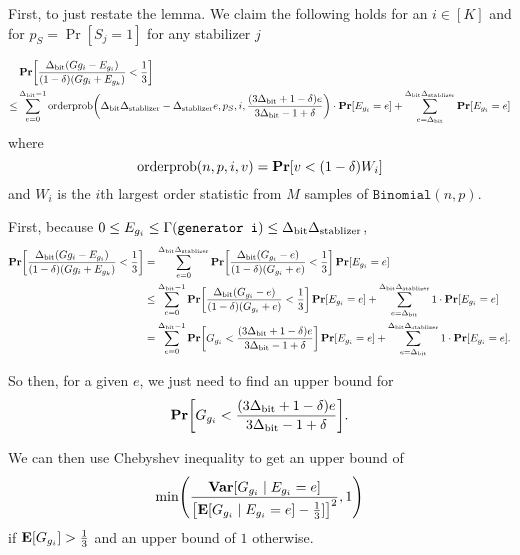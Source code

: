 \newcommand{\orderpinner}{\DegBit\DegStable - \DegStable e, p_S, i, \frac{(3\DegBit + 1 - \delta) e}{3\DegBit -1 + \delta}}
\newcommand{\desiredGPrimeUpperBound}{\frac{(3 \DegBit + 1 - \delta) e}{3 \DegBit - 1 + \delta}}
\newcommand{\generatorscoreRVGivenE}{G^e}

First, to just restate the lemma.
We claim the following holds for an $i \in [K]$ and for $p_S = \Pr[S_j = 1]$ for any stabilizer $j$
	
\begin{align*}
	&\Pr\mleft[\OptVarEq < \frac{1}{3}\mright] \\
	\leq &\sum_{e = 0}^{\DegBit - 1} 
			\OrderP\mleft(\orderpinner\mright) \cdot \Pr[\lyingGenerator_{g_i} = e] 
			+ \sum_{e = \DegBit}^{\DegBit\DegStable}\Pr[\lyingGenerator_{g_i} = e]
\end{align*}
where
$$
	\OrderP(n, p, i, v) = \Pr\mleft[v < (1 - \delta) W_i \mright]
$$
and $W_i$ is the $i$th largest order statistic from $M$ samples of $\texttt{Binomial}(n, p)$.


First, because $0 \leq E_{g_i} \leq \Gamma(\texttt{generator i}) \leq {\Delta_{\text{bit}}} {\Delta_{\text{stablizer}}}$, 
\begin{align*}
\Pr\mleft[\OptVarEq < \frac{1}{3}\mright] &= 
	\sum_{e = 0}^{\DegBit \DegStable} 
		\Pr\mleft[\frac{\DegBit(\genscoreRVCorrected_{g_i} - e)}{(1 - \delta)(\genscoreRVCorrected_{g_i} + e)} < \frac{1}{3} \mright] \Pr\mleft[\lyingGenerator_{g_i} = e\mright]\\
&\leq
	\sum_{e = 0}^{\DegBit - 1} 
		\Pr\mleft[\frac{\DegBit(\genscoreRVCorrected_{g_i} - e)}{(1 - \delta)(\genscoreRVCorrected_{g_i} + e)} < \frac{1}{3} \mright] \Pr\mleft[\lyingGenerator_{g_i} = e\mright]
	+ \sum_{e = \DegBit}^{\DegBit \DegStable} 1 \cdot \Pr\mleft[E_{g_i} = e\mright]\\
&=
	\sum_{e = 0}^{\DegBit - 1} 
		\Pr\mleft[\genscoreRVCorrected_{g_i} < \frac{(3 \DegBit + 1 - \delta) e}{3 \DegBit - 1 + \delta} \mright] \Pr\mleft[E_{g_i} = e\mright]
	+ \sum_{e = \DegBit}^{\DegBit \DegStable} 1 \cdot \Pr\mleft[\lyingGenerator_{g_i} = e\mright].\\
\end{align*}

So then, for a given $e$,
we just need to find an upper bound for
\begin{align*}
	\Pr\mleft[\genscoreRVCorrected_{g_i} < \desiredGPrimeUpperBound \mright].
\end{align*}

We can then use Chebyshev inequality to get an upper bound of
$$
	\min\mleft(\frac{\Var[\genscoreRVCorrected_{g_i} \mid \lyingGenerator_{g_i} = e]}
		{\mleft[\E[\genscoreRVCorrected_{g_i} \mid \lyingGenerator_{g_i} = e] - \frac{1}{3}]\mright]^2}, 1\mright)
$$
if $\operatorname*{\mathbf{E}}[G_{g_i}] > \frac{1}{3}$ and an upper bound of $1$ otherwise.

